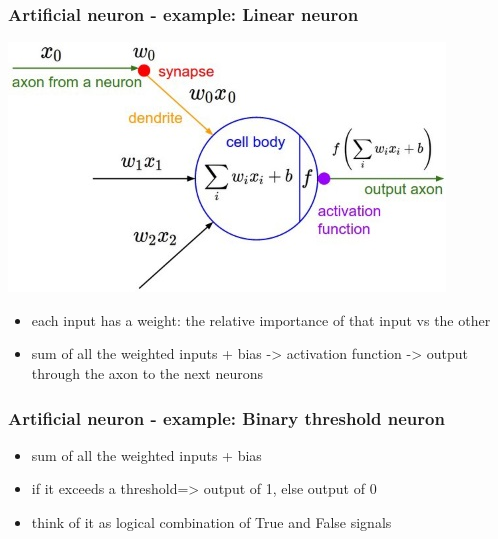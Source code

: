 \documentclass[xcolor=table]{beamer}
\begin{document}
\begin{mdframe}%

\frametitle{Artificial neuron - example: Linear neuron}\label{heading-sec-artificial-neuron---example--linear-neuron}%

\noindent{}\includegraphics[keepaspectratio=true,width=\dimmin{}{\dimwidth{0.90}}]{images/artneuron}{}%

\begin{itemize}%

\item{}
each input has a weight: the relative importance of that input vs the other%

\item{}
sum of all the weighted inputs + bias -\textgreater{} activation function -\textgreater{} output through the axon to the next neurons%
\end{itemize}%
\end{mdframe}\label{sec-artificial-neuron---example--linear-neuron}%

\begin{mdframe}%

\frametitle{Artificial neuron - example: Binary threshold neuron}\label{heading-sec-artificial-neuron---example--binary-threshold-neuron}%

\begin{itemize}%

\item{}
sum of all the weighted inputs + bias%

\item{}
if it exceeds a threshold=\textgreater{} output of 1, else output of 0%

\item{}
think of it as logical combination of True and False signals%
\end{itemize}%
\end{mdframe}\label{sec-artificial-neuron---example--binary-threshold-neuron}%
\end{document}
